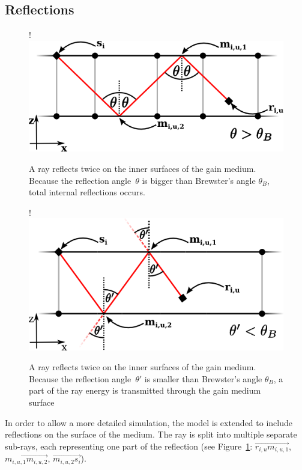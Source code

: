 \subsection{Reflections} \label{subsec:reflections}
\begin{figure}[H]
  \centerline{
     {!} {\includegraphics{./graphics/reflections_2.png}}
  }
  \caption{A ray reflects twice on the inner surfaces of the gain
    medium. Because the reflection angle~$\theta$ is bigger than
    Brewster's angle $\theta_{B}$, total internal reflections occurs.}
  \label{graphic:reflections_2D}
\end{figure}
\begin{figure}[H]
  \centerline{
     {!} {\includegraphics{./graphics/transmission1.png}}
  }
  \caption{A ray reflects twice on the inner surfaces of the gain
    medium. Because the reflection angle~$\theta'$ is smaller than
    Brewster's angle $\theta_{B}$, a part of the ray energy is
    transmitted through the gain medium surface}
  \label{graphic:transmission_2D}
\end{figure}
In order to allow a more detailed simulation, the model is extended to include
reflections on the surface of the medium. The ray is split into multiple
separate sub-rays, each representing one part of the reflection (see
Figure~\ref{graphic:reflections_2D}: $\overrightarrow{r_{i,u}m_{i,u,1}}$,
$\overrightarrow{m_{i,u,1}m_{i,u,2}}$, $\overrightarrow{m_{i,u,2}s_i}$).

